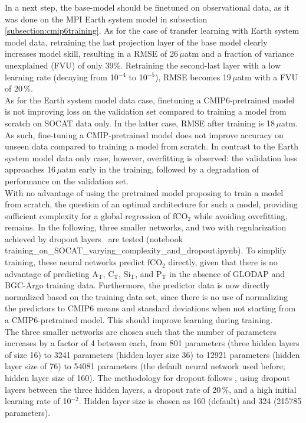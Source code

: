 \documentclass{article}
\begin{document}
	In a next step, the base-model should be finetuned on observational data, as it was done on the MPI Earth system model in subsection \ref{subsection:cmip6training}. As for the case of transfer learning with Earth system model data, retraining the last projection layer of the base model clearly increases model skill, resulting in a RMSE of 26\,$\mu$atm and a fraction of variance unexplained (FVU) of only 39\%. Retraining the second-last layer with a low learning rate (decaying from 10$^{-4}$ to 10$^{-5}$), RMSE becomes 19\,$\mu$atm with a FVU of 20\,\%. \\
	
	As for the Earth system model data case, finetuning a CMIP6-pretrained model is not improving loss on the validation set compared to training a model from scratch on SOCAT data only. In the latter case, RMSE after training is 18\,$\mu$atm. As such, fine-tuning a CMIP-pretrained model does not improve accuracy on unseen data compared to training a model from scratch. In contrast to the Earth system model data only case, however, overfitting is observed: the validation loss approaches 16\,$\mu$atm early in the training, followed by a degradation of performance on the validation set. \\
	
	With no advantage of using the pretrained model proposing to train a model from scratch, the question of an optimal architecture for such a model, providing sufficient complexity for a global regression of fCO$_2$ while avoiding overfitting, remains. In the following, three smaller networks, and two with regularization achieved by dropout layers~\citep{srivastava20124dropout} are tested (notebook training\_on\_SOCAT\_varying\_complexity\_and\_dropout.ipynb). To simplify training, these neural networks predict fCO$_2$ directly, given that there is no advantage of predicting A$_\text{T}$, C$_\text{T}$, Si$_\text{T}$, and P$_\text{T}$ in the absence of GLODAP and BGC-Argo training data. Furthermore, the predictor data is now directly normalized based on the training data set, since there is no use of normalizing the predictors to CMIP6 means and standard deviations when not starting from a CMIP6-pretrained model. This should improve learning during training.   \\
	
	The three smaller networks are chosen such that the number of parameters increases by a factor of 4 between each, from 801 parameters (three hidden layers of size 16) to 3241 parameters (hidden layer size 36) to 12921 parameters (hidden layer size of 76) to 54081 parameters (the default neural network used before; hidden layer size of 160).  The methodology for dropout follows \cite{srivastava2014}, using dropout layers between the three hidden layers, a dropout rate of 20\,\%, and a high initial learning rate of 10$^{-2}$. Hidden layer size is chosen as 160 (default) and 324 (215785 parameters). \\ 
	
\end{document}
